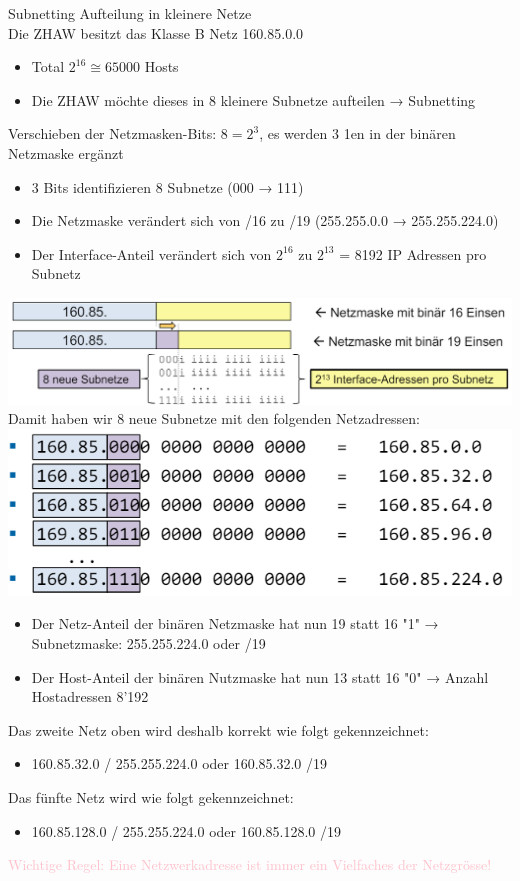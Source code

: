 \begin{concept}{Subnetting}
    Aufteilung in kleinere Netze\\
    Die ZHAW besitzt das Klasse B Netz 160.85.0.0
    \begin{itemize}
        \item Total $2^{16} \cong 65000$  Hosts
        \item Die ZHAW möchte dieses in 8 kleinere Subnetze aufteilen → Subnetting
    \end{itemize}
    Verschieben der Netzmasken-Bits: $8 = 2^3$, es werden 3 1en in der binären Netzmaske ergänzt
    \begin{itemize}
        \item 3 Bits identifizieren 8 Subnetze (000 → 111)
        \item Die Netzmaske verändert sich von /16 zu /19 (255.255.0.0 → 255.255.224.0)
        \item Der Interface-Anteil verändert sich von $2^{16}$ zu $2^{13}$ = 8192 IP Adressen pro Subnetz
    \end{itemize}
        \includegraphics[width=1\linewidth]{images/subnetting1.png}\\
    Damit haben wir 8 neue Subnetze mit den folgenden Netzadressen:\\
        \includegraphics[width=0.75\linewidth]{images/subnetting2.png}
    \begin{itemize}
        \item Der Netz-Anteil der binären Netzmaske hat nun 19 statt 16 "1" → Subnetzmaske: 255.255.224.0 oder /19
        \item Der Host-Anteil der binären Nutzmaske hat nun 13 statt 16 "0" → Anzahl Hostadressen 8'192
    \end{itemize}
    Das zweite Netz oben wird deshalb korrekt wie folgt gekennzeichnet:
    \begin{itemize}
        \item 160.85.32.0 / 255.255.224.0 oder 160.85.32.0 /19
    \end{itemize}
    Das fünfte Netz wird wie folgt gekennzeichnet:
    \begin{itemize}
        \item 160.85.128.0 / 255.255.224.0 oder 160.85.128.0 /19
    \end{itemize}
    \textcolor{pink}{Wichtige Regel: Eine Netzwerkadresse ist immer ein Vielfaches der Netzgrösse!}
\end{concept}

